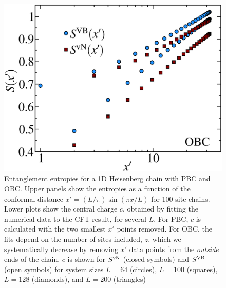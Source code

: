 \begin{figure} {
\includegraphics[width=4.5in]{./figures/paper1/figure1/thesis_obc.eps} 
\centering
\caption[1D OBC Results for VB EE and von Neumann EE]{
{\color{red}
Entanglement entropies for a 1D Heisenberg chain with PBC and OBC. Upper
panels show the entropies as a function of the conformal distance $x'  = (L/\pi)\sin (\pi x/L)$ for
100-site chains.  Lower plots show the central
charge $c$, obtained by fitting the numerical data to the CFT result, for
several $L$.  For PBC, $c$ is calculated with the two smallest $x'$ points
removed.  For OBC, the fits depend on the number of sites included, $z$,
which we systematically decrease by removing $x'$ data points from the
{\it outside} ends of the chain.  $c$ is shown for $S^{\rm vN}$
(closed symbols) and $S^{\rm VB}$ (open symbols) for system sizes $L=64$
(circles), $L=100$ (squares), $L=128$ (diamonds), and $L=200$ (triangles)
\label{1dOBC}}
} }
\end{figure}

